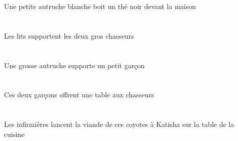 \begin{exe}
Une petite autruche blanche boit un thé noir devant la maison
\ex\glll
\DEFPlErg{}   \litDPlErg{}   \DEFDuAbs{}   \grosCDu{}   \chasseurCDuAbs{}  \supporterVtPrsCDu{}\\
\DEFPlErgP{}   \litDPlErgP{}   \DEFDuAbsP{}   \grosCDuP{}   \chasseurCDuAbsP{}  \supporterVtPrsCDuP{}\\
\DEFPlErgG{}   \litDPlErgG{}   \DEFDuAbsG{}   \grosCDuG{}   \chasseurCDuAbsG{}  \supporterVtPrsCDuG{}\\
Les lits supportent les deux gros chasseurs
\ex\glll
\INDSgErg{}   \grosDSg{}   \autrucheDSgErg{}   \INDSgAbs{}   \petitBSg{}   \garconBSgAbs{}  \supporterVtPrsBSg{}\\
\INDSgErgP{}   \grosDSgP{}   \autrucheDSgErgP{}   \INDSgAbsP{}   \petitBSgP{}   \garconBSgAbsP{}  \supporterVtPrsBSgP{}\\
\INDSgErgG{}   \grosDSgG{}   \autrucheDSgErgG{}   \INDSgAbsG{}   \petitBSgG{}   \garconBSgAbsG{}  \supporterVtPrsBSgG{}\\
Une grosse autruche supporte un petit garçon
\ex\glll
\DEMDuErg{}   \garconBDuErg{}    \DEFPlDat{}   \chasseurCPlDat{}   \INDSgAbs{}   \tableCSgAbs{}  \offrirVdPrsCSg{}\\
\DEMDuErgP{}   \garconBDuErgP{}    \DEFPlDatP{}   \chasseurCPlDatP{}   \INDSgAbsP{}   \tableCSgAbsP{}  \offrirVdPrsCSgP{}\\
\DEMDuErgG{}   \garconBDuErgG{}    \DEFPlDatG{}   \chasseurCPlDatG{}   \INDSgAbsG{}   \tableCSgAbsG{}  \offrirVdPrsCSgG{}\\
Ces deux garçons offrent une table aux chasseurs
\ex\glll
\DEFSgObl{}    \DEFSgObl{}   \cuisineCSgObl{}   \DE{}   \tableCSgObl{}   \SUR{}   \DEFPlErg{}   \infirmiereBPlErg{}    \INDSgDat{}   \KatishaASgDat{}   \DEFSgAbs{}    \DEMPlObl{}   \coyoteAPlObl{}   \DE{}   \viandeASgAbs{}  \lancerVdPrsASg{}\\
\DEFSgOblP{}    \DEFSgOblP{}   \cuisineCSgOblP{}   \DEP{}   \tableCSgOblP{}   \SURP{}   \DEFPlErgP{}   \infirmiereBPlErgP{}    \INDSgDatP{}   \KatishaASgDatP{}   \DEFSgAbsP{}    \DEMPlOblP{}   \coyoteAPlOblP{}   \DEP{}   \viandeASgAbsP{}  \lancerVdPrsASgP{}\\
\DEFSgOblG{}    \DEFSgOblG{}   \cuisineCSgOblG{}   \DEG{}   \tableCSgOblG{}   \SURG{}   \DEFPlErgG{}   \infirmiereBPlErgG{}    \INDSgDatG{}   \KatishaASgDatG{}   \DEFSgAbsG{}    \DEMPlOblG{}   \coyoteAPlOblG{}   \DEG{}   \viandeASgAbsG{}  \lancerVdPrsASgG{}\\
Les infirmières lancent la viande de ces coyotes à Katisha sur la table de la cuisine
\ex\glll

\end{exe}
